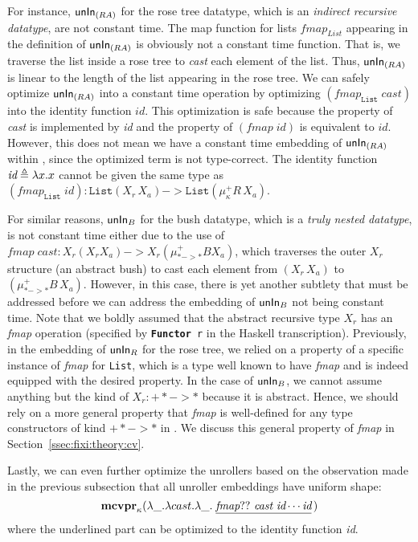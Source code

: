 For instance, $\mathsf{unIn}_{(R A)}$ for the rose tree datatype, which is an
\emph{indirect recursive datatype}, are not constant time. The map function
for lists $\textit{fmap}_\textit{List}$ appearing in the definition
of $\mathsf{unIn}_{(R A)}$ is obviously not a constant time function. That is,
we traverse the list inside a rose tree to \textit{cast} each element of
the list. Thus, $\mathsf{unIn}_{(R A)}$ is linear to the length of the list appearing
in the rose tree. We can safely optimize $\mathsf{unIn}_{(R A)}$ into a constant time
operation by optimizing $(\textit{fmap}_\texttt{List}\;\textit{cast})$
into the identity function $\textit{id}$. This optimization is safe because
the property of \textit{cast} is implemented by \textit{id} and the property of
$(\textit{fmap}\;\textit{id})$ is equivalent to $\textit{id}$.
However, this does not mean we have a constant time embedding of $\mathsf{unIn}_{(R A)}$
within \Fixi, since the optimized term is not type-correct.
The identity function $\textit{id}\triangleq \lambda x.x$ cannot be given
the same type as $(\textit{fmap}_\texttt{List}\;\textit{id}) :
	\texttt{List}(X_r\,X_a) -> \texttt{List}(\mu^{+}_\kappa R\,X_a)$.

For similar reasons, $\mathsf{unIn}_B$ for the bush datatype, which is a
\emph{truly nested datatype}, is not constant time either
due to the use of $\textit{fmap}\;\textit{cast} :
			X_r(X_rX_a) -> X_r(\mu^{+}_{* -> *}B X_a)$,
which traverses the outer $X_r$ structure (an abstract bush) to cast each
element from $(X_r\,X_a)$ to $(\mu^{+}_{* -> *}B\,X_a)$. However, in this case,
there is yet another subtlety that must be addressed before we can address
the embedding of $\mathsf{unIn}_B$ not being constant time. Note that we boldly assumed
that the abstract recursive type $X_r$ has an \textit{fmap} operation
(specified by \texttt{{\bf\ttfamily Functor} r} in the Haskell transcription).
Previously, in the embedding of $\mathsf{unIn}_R$ for the rose tree, we relied on
a property of a specific instance of \textit{fmap} for \texttt{List},
which is a type well known to have \textit{fmap} and is indeed equipped with
the desired property. In the case of $\mathsf{unIn}_B$, we cannot assume anything but
the kind of $X_r : +* -> *$ because it is abstract. Hence, we should rely on
a more general property that \textit{fmap} is well-defined for any
type constructors of kind $+* -> *$ in \Fixi. We discuss this
general property of \textit{fmap} in Section~\ref{ssec:fixi:theory:cv}.

Lastly, we can even further optimize the unrollers based on the observation
made in the previous subsection that all unroller embeddings have uniform shape:
\[
\mathbf{mcvpr}_\kappa (\lambda\_.\lambda cast.\lambda\_.\;
	\underline{\textit{fmap}??~\textit{cast}~\textit{id}\cdots\textit{id}}
	\,)
\]
where the underlined part can be optimized to the identity function \textit{id}.

